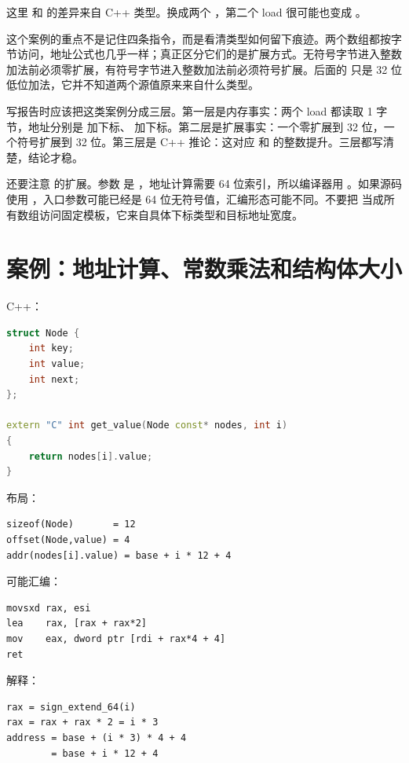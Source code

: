 这里  和  的差异来自 C++ 类型。换成两个 ，第二个 load 很可能也变成 。

这个案例的重点不是记住四条指令，而是看清类型如何留下痕迹。两个数组都按字节访问，地址公式也几乎一样；真正区分它们的是扩展方式。无符号字节进入整数加法前必须零扩展，有符号字节进入整数加法前必须符号扩展。后面的  只是 32 位低位加法，它并不知道两个源值原来来自什么类型。

写报告时应该把这类案例分成三层。第一层是内存事实：两个 load 都读取 1 字节，地址分别是  加下标、 加下标。第二层是扩展事实：一个零扩展到 32 位，一个符号扩展到 32 位。第三层是 C++ 推论：这对应  和  的整数提升。三层都写清楚，结论才稳。

还要注意  的扩展。参数  是 ，地址计算需要 64 位索引，所以编译器用 。如果源码使用 ，入口参数可能已经是 64 位无符号值，汇编形态可能不同。不要把  当成所有数组访问固定模板，它来自具体下标类型和目标地址宽度。

\section{案例：地址计算、常数乘法和结构体大小}

C++：

\begin{lstlisting}[language=C++]
struct Node {
    int key;
    int value;
    int next;
};

extern "C" int get_value(Node const* nodes, int i)
{
    return nodes[i].value;
}
\end{lstlisting}

布局：

\begin{lstlisting}
sizeof(Node)       = 12
offset(Node,value) = 4
addr(nodes[i].value) = base + i * 12 + 4
\end{lstlisting}

可能汇编：

\begin{lstlisting}
movsxd rax, esi
lea    rax, [rax + rax*2]
mov    eax, dword ptr [rdi + rax*4 + 4]
ret
\end{lstlisting}

解释：

\begin{lstlisting}
rax = sign_extend_64(i)
rax = rax + rax * 2 = i * 3
address = base + (i * 3) * 4 + 4
        = base + i * 12 + 4
\end{lstlisting}

